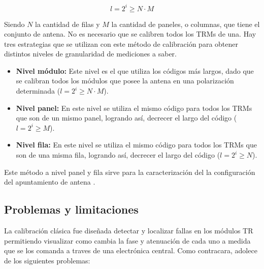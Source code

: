 \begin{equation}
	l = 2^i \ge N \cdot M
\end{equation}

Siendo $N$ la cantidad de filas y $M$ la cantidad de paneles, o columnas, que tiene el conjunto de antena. No es necesario que 
se calibren todos los TRMs de una. Hay tres estrategias que se utilizan con este método de calibración para obtener 
distintos niveles de granularidad de mediciones a saber.

\begin{itemize}
	\item \textbf{Nivel módulo:} Este nivel es el que utiliza los códigos más largos, dado que se calibran todos los módulos que 
		posee la antena en una polarización determinada ($l = 2^i \ge N \cdot M$).
	\item \textbf{Nivel panel:} En este nivel se utiliza el mismo código para todos los TRMs que son de un mismo panel, 
		logrando así, decrecer el largo del código ($l = 2^i \ge M$).
	\item \textbf{Nivel fila:} En este nivel se utiliza el mismo código para todos los TRMs que son de una misma fila, 
		logrando así, decrecer el largo del código ($l = 2^i \ge N$).
\end{itemize}

Este método a nivel panel y fila sirve para la caracterización del la configuración del apuntamiento de antena \cite{Br2007}.

\subsection{Problemas y limitaciones}

La calibración clásica fue diseñada detectar y localizar fallas en los módulos TR permitiendo visualizar como cambia la 
fase y atenuación de cada uno a medida que se los comanda a traves de una electrónica central. Como contracara, adolece de 
los siguientes problemas:

